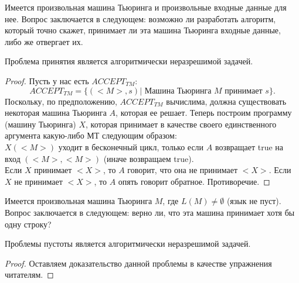     \begin{Def}
        Имеется произвольная машина Тьюринга и произвольные входные данные для нее. Вопрос заключается в следующем: возможно ли разработать алгоритм, который точно скажет, принимает ли эта машина Тьюринга входные данные, либо же отвергает их.
    \end{Def}
    
    \begin{Thm}
        Проблема принятия является алгоритмически неразрешимой задачей.
    \end{Thm}
    
    \begin{proof}
        Пусть у нас есть $ACCEPT_{TM}$:
        $$ACCEPT_{TM} = \{(<M>, s ) | \text{ Машина Тьюринга } M \text{ принимает } s\}.$$
        Поскольку, по предположению, $ACCEPT_{TM}$ вычислима, должна существовать некоторая машина Тьюринга $A$, которая ее решает. 
        Теперь построим программу (машину Тьюринга) $X$, которая принимает в качестве своего единственного аргумента какую-либо МТ следующим образом:\\
        $X(<M>)$ уходит в бесконечный цикл, только если
        $A$ возвращает true на вход $(<M>, <M>)$ (иначе возвращаем true).\\
        Если $X$ принимает $<X>$, то $A$ говорит, что она не принимает $<X>$. Если $X$ не принимает $<X>$, то $A$ опять говорит обратное. Противоречие.
    \end{proof}
    
    \begin{Def}
        Имеется произвольная машина Тьюринга $M$, где $L(M) \neq \emptyset$ (язык не пуст). Вопрос заключается в следующем: верно ли, что эта машина принимает хотя бы одну строку?
    \end{Def}
    
    \begin{Thm}
        Проблемы пустоты является алгоритмически неразрешимой задачей.
    \end{Thm}
    
    \begin{proof}
        Оставляем доказательство данной проблемы в качестве упражнения читателям.
    \end{proof}
    
    
    
